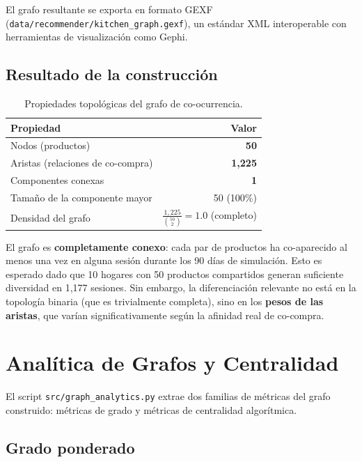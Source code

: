 \documentclass[12pt,a4paper]{article}
\newcommand{\metric}[1]{\textcolor{metricblue}{\textbf{#1}}}
\newcommand{\code}[1]{\texttt{\small #1}}
\begin{document}
El grafo resultante se exporta en formato GEXF (\code{data/recommender/kitchen\_graph.gexf}), un estándar XML interoperable con herramientas de visualización como Gephi.

\subsection{Resultado de la construcción}

\begin{table}[H]
\centering
\caption{Propiedades topológicas del grafo de co-ocurrencia.}
\label{tab:graph_overview}
\begin{tabular}{lr}
\toprule
\textbf{Propiedad} & \textbf{Valor} \\
\midrule
Nodos (productos) & \metric{50} \\
Aristas (relaciones de co-compra) & \metric{1{,}225} \\
Componentes conexas & \metric{1} \\
Tamaño de la componente mayor & 50 (100\%) \\
Densidad del grafo & $\frac{1{,}225}{\binom{50}{2}} = 1.0$ (completo) \\
\bottomrule
\end{tabular}
\end{table}

El grafo es \textbf{completamente conexo}: cada par de productos ha co-aparecido al menos una vez en alguna sesión durante los 90 días de simulación. Esto es esperado dado que 10 hogares con 50 productos compartidos generan suficiente diversidad en 1,177 sesiones. Sin embargo, la diferenciación relevante no está en la topología binaria (que es trivialmente completa), sino en los \textbf{pesos de las aristas}, que varían significativamente según la afinidad real de co-compra.

\section{Analítica de Grafos y Centralidad}

El script \code{src/graph\_analytics.py} extrae dos familias de métricas del grafo construido: métricas de grado y métricas de centralidad algorítmica.

\subsection{Grado ponderado}
\end{document}
